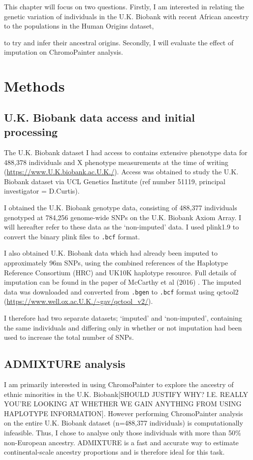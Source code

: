 This chapter will focus on two questions. Firstly, I am interested in relating the genetic variation of individuals in the U.K. Biobank with recent African ancestry to the populations in the Human Origins dataset, {\color{red}to try and infer their ancestral origins. Secondly, I will evaluate the effect of imputation on ChromoPainter analysis. 


\section{Methods}

\subsection{U.K. Biobank data access and initial processing}

The U.K. Biobank dataset I had access to contains extensive phenotype data for 488,378 individuals and X phenotype measurements at the time of writing (\url{https://www.U.K.biobank.ac.U.K./}). Access was obtained to study the U.K. Biobank dataset via UCL Genetics Institute (ref number 51119, principal investigator = D.Curtis). 

I obtained the U.K. Biobank genotype data, consisting of 488,377 individuals genotyped at 784,256 genome-wide SNPs on the U.K. Biobank Axiom Array. I will hereafter refer to these data as the `non-imputed' data. I used plink1.9 \cite{purcell2007plink} to convert the binary plink files to \texttt{.bcf} format. 

I also obtained U.K. Biobank data which had already been imputed to approximately 96m SNPs, using the combined references of the Haplotype Reference Consortium (HRC) and UK10K haplotype resource. Full details of imputation can be found in the paper of McCarthy et al (2016) \cite{mccarthy2016reference}. The imputed data was downloaded and converted from \texttt{.bgen} to \texttt{.bcf} format using qctool2 (\url{https://www.well.ox.ac.U.K./~gav/qctool_v2/}). 

I therefore had two separate datasets; `imputed' and `non-imputed', containing the same individuals and differing only in whether or not imputation had been used to increase the total number of SNPs.

\subsection{ADMIXTURE analysis}

I am primarily interested in using ChromoPainter \cite{Lawson2012} to explore the ancestry of ethnic minorities in the U.K. Biobank{\color{red}[SHOULD JUSTIFY WHY? I.E. REALLY YOU'RE LOOKING AT WHETHER WE GAIN ANYTHING FROM USING HAPLOTYPE INFORMATION]}. However performing ChromoPainter analysis on the entire U.K. Biobank dataset (n=488,377 individuals) is computationally infeasible. Thus, I chose to analyse only those individuals with more than 50\% non-European ancestry. ADMIXTURE is a fast and accurate way to estimate continental-scale ancestry proportions \cite{alexander2009fast} and is therefore ideal for this task. 

}
